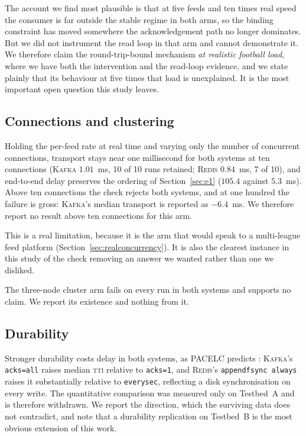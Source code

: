 \documentclass[Afour,sageh,times]{sagej}
\newcommand{\redis}{\textsc{Redis}}
\newcommand{\kafka}{\textsc{Kafka}}
\newcommand{\tti}{\textsc{tti}}
\begin{document}
The account we find most plausible is that at five feeds and ten times real speed the consumer is
far outside the stable regime in both arms, so the binding constraint has moved somewhere the
acknowledgement path no longer dominates. But we did not instrument the read loop in that arm and
cannot demonstrate it. We therefore claim the round-trip-bound mechanism \emph{at realistic
football load}, where we have both the intervention and the read-loop evidence, and we state
plainly that its behaviour at five times that load is unexplained. It is the most important open
question this study leaves.

\subsection{Connections and clustering}
\label{sec:conncluster}

Holding the per-feed rate at real time and varying only the number of concurrent connections,
transport stays near one millisecond for both systems at ten connections (\kafka{} $1.01$~ms,
10 of 10 runs retained; \redis{} $0.84$~ms, 7 of 10), and end-to-end delay preserves the ordering
of Section~\ref{sec:e1} ($105.4$ against $5.3$~ms). Above ten connections the check rejects both
systems, and at one hundred the failure is gross: \kafka{}'s median transport is reported as
$-6.4$~ms. We therefore report no result above ten connections for this arm.

This is a real limitation, because it is the arm that would speak to a multi-league feed platform
(Section~\ref{sec:realconcurrency}). It is also the clearest instance in this study of the check
removing an answer we wanted rather than one we disliked.

The three-node cluster arm fails on every run in both systems and supports no claim. We report its
existence and nothing from it.

\subsection{Durability}
\label{sec:durability}

Stronger durability costs delay in both systems, as PACELC predicts \cite{abadi2012pacelc}:
\kafka{}'s \texttt{acks=all} raises median \tti{} relative to \texttt{acks=1}, and \redis{}'s
\texttt{appendfsync always} raises it substantially relative to \texttt{everysec}, reflecting a
disk synchronisation on every write. The quantitative comparison was measured only on Testbed~A
and is therefore withdrawn. We report the direction, which the surviving data does not
contradict, and note that a durability replication on Testbed~B is the most obvious extension of
this work.
\end{document}
